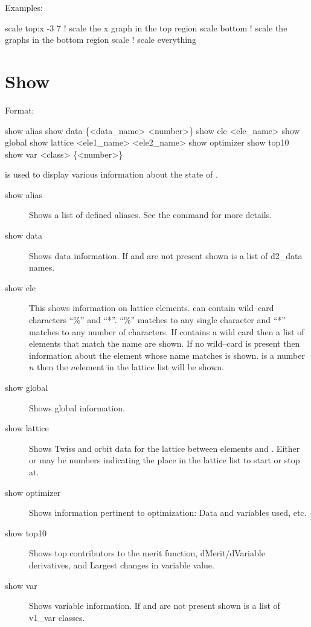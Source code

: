 Examples:
\begin{example}
  scale top:x -3  7  ! scale the x graph in the top region
  scale bottom       ! scale the graphs in the bottom region
  scale              ! scale everything
\end{example}


\section{Show}
\label{s:show}

Format:
\begin{example}
  show alias                     
  show data \{<data_name> <number>\} 
  show ele <ele_name>
  show global
  show lattice <ele1_name> <ele2_name>
  show optimizer
  show top10
  show var <class> \{<number>\}
\end{example}

\vskip 0.2in
 is used to display various information about the state of \tao.
\begin{description}
\item[show alias]
Shows a list of defined aliases. See the  command for more
details.
\item[show data]
Shows data information. If  and  are not
present shown is a list of d2\_data names.
\item[show ele]
This shows information on lattice elements.  can
contain wild--card characters ``\%'' and ``*''. ``\%'' matches to any
single character and ``*'' matches to any number of characters. If
 contains a wild card then a list of elements that
match the name are shown. If no wild--card is present then information
about the element whose name matches  is
shown.  is a number $n$ then the $n$\Th element in the
lattice list will be shown.
\item[show global]
Shows global information.
\item[show lattice]
Shows Twiss and orbit data for the  lattice between elements
 and . Either  or
 may be numbers indicating the place in the lattice
list to start or stop at.
\item[show optimizer]
Shows information pertinent to optimization: Data and variables used, etc.
\item[show top10]
Shows top contributors to the merit function, dMerit/dVariable
derivatives, and Largest changes in variable value.
\item[show var]
Shows variable information. If  and  are
not present shown is a list of v1\_var classes.
\end{description}

